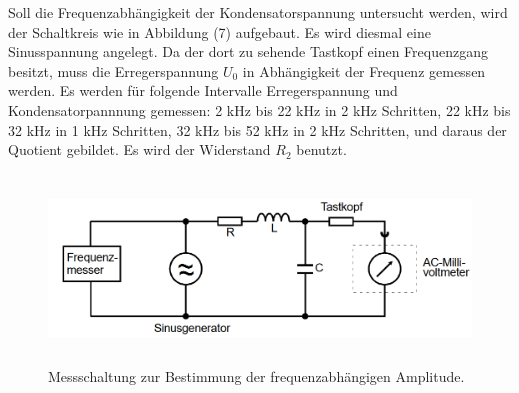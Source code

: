 \noindent Soll die Frequenzabhängigkeit der Kondensatorspannung untersucht werden, wird der Schaltkreis wie in Abbildung (7) aufgebaut.
Es wird diesmal eine Sinusspannung angelegt. Da der dort zu sehende Tastkopf einen Frequenzgang besitzt, muss die Erregerspannung $U_0$ in Abhängigkeit der Frequenz gemessen werden.
Es werden für folgende Intervalle Erregerspannung und Kondensatorpannnung gemessen: 2 \si{\kilo\hertz} bis 22 \si{\kilo\hertz} in 2 \si{\kilo\hertz} Schritten, 22 \si{\kilo\hertz} bis 32 \si{\kilo\hertz} in 1 \si{\kilo\hertz} Schritten,
32 \si{\kilo\hertz} bis 52 \si{\kilo\hertz} in 2 \si{\kilo\hertz} Schritten, und daraus der Quotient gebildet. Es wird der Widerstand  $R_2$ benutzt.
\begin{figure}[H]
  \centering
  \includegraphics[height=5cm]{Schaltung3.png}
  \caption{Messschaltung zur Bestimmung der frequenzabhängigen Amplitude. \cite[S. 13]{kent}}
\end{figure}


